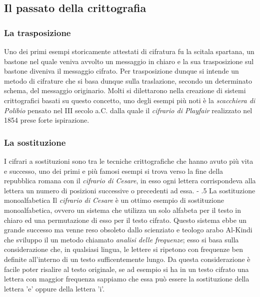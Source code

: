 \documentclass[a4paper, 12pt]{article}
\makeatletter
\renewcommand\paragraph{%
        \@startsection{paragraph}{4}{0mm}%
           {-\baselineskip}%
           {.5\baselineskip}%
           {\normalfont\normalsize\bfseries}}
\makeatother
\begin{document}
\subsection{Il passato della crittografia}
\subsubsection{La trasposizione}
Uno dei primi esempi storicamente attestati di cifratura fu la scitala spartana, un bastone nel quale veniva avvolto un messaggio in chiaro e la sua trasposizione sul bastone diveniva il messaggio cifrato. Per trasposizione dunque si intende un metodo di cifrature che si basa dunque sulla traslazione, secondo un determinato schema, del messaggio originario.\newline
Molti si dilettarono nella creazione di sistemi crittografici basati su questo concetto, uno degli esempi più noti è la \textit{scacchiera di Polibio} pensato nel III secolo a.C. dalla quale il \textit{cifrario di Playfair} realizzato nel 1854 prese forte ispirazione.
\subsubsection{La sostituzione}
I cifrari a sostituzioni sono tra le tecniche crittografiche che hanno avuto più vita e successo, uno dei primi e più famosi esempi si trova verso la fine della repubblica romana con il \textit{cifrario di Cesare}, in esso ogni lettera corrispondeva alla lettera un numero di posizioni successive o precedenti ad essa. 
\paragraph{La sostituzione monoalfabetica}
Il \textit{cifrario di Cesare} è un ottimo esempio di sostituzione monoalfabetica, ovvero un sistema che utilizza un solo alfabeta per il testo in chiaro ed una permutazione di esso per il testo cifrato.\newline
Questo sistema ebbe un grande successo ma venne reso obsoleto dallo scienziato e teologo arabo Al-Kindi che sviluppo il un metodo chiamato \textit{analisi delle frequenze}; esso si basa sulla considerazione che, in qualsiasi lingua, le lettere si ripetono con frequenze ben definite all'interno di un testo sufficentemente lungo. Da questa considerazione è facile poter risalire al testo originale, se ad esempio si ha in un testo cifrato una lettera con maggior frequenza sappiamo che essa può essere la sostituzione della lettera 'e' oppure della lettera 'i'.
\end{document}
